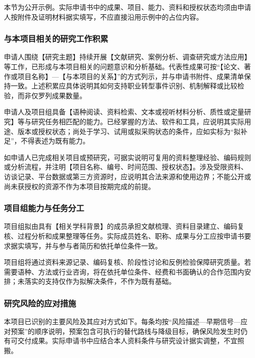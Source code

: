 \justifying
\NSFCBodyText

本节为公开示例。实际申请书中的成果、项目、能力、资料和授权状态均须由申请人按附件及证明材料据实填写，不应直接沿用示例中的占位内容。

\subsubsection{与本项目相关的研究工作积累}

申请人围绕【研究主题】持续开展【文献研究、案例分析、调查研究或方法应用】等工作，已形成与本项目相关的问题意识和分析基础。代表性成果可按“【论文、著作或项目名称】---【与本项目的关系】”的方式列示，并与申请书附件、成果清单保持一致。上述积累应具体说明其如何支持职业转型事件识别、机制解释或比较检验，而非仅罗列成果数量。

申请人及项目组具备【语种阅读、资料检索、文本或视听材料分析、质性或定量研究】等与研究任务相匹配的能力。已经掌握的方法、软件和工具，应说明其实际用途、版本或授权状态；尚处于学习、试用或拟采购状态的条件，应如实标为“拟补足”，不得表述为既有能力。

如申请人已完成相关项目或预研究，可据实说明可复用的资料整理经验、编码规则或分析流程，并注明【项目名称、编号、时间范围、授权状态】。涉及受限资料、访谈记录、平台数据或第三方资源时，应说明其合法来源和使用边界；不能公开或尚未获授权的资源不作为本项目按期完成的前提。

\subsubsection{项目组能力与任务分工}

项目组拟由具有【相关学科背景】的成员承担文献梳理、资料目录建立、编码复核、过程分析和成果整理等任务。实际成员姓名、职称、成果与分工应按申请书要求据实填写，并与参与者简历和依托单位条件一致。

项目组将通过资料来源记录、编码复核、阶段性讨论和反例检验保障研究质量。若需要语种、方法或行业咨询，将在依托单位条件、经费和书面确认的合作范围内安排；未落实的支持仅作为拟解决条件，不作为既有基础。

\subsubsection{研究风险的应对措施}

本项目已识别的主要风险及其应对方式如下。每条均按“风险描述---早期信号---应对预案”的顺序说明，预案包含可执行的替代路线与降级目标，确保风险发生时仍有可交付成果。实际申请书中应结合本人资料条件与研究设计据实调整，不宜照搬。

